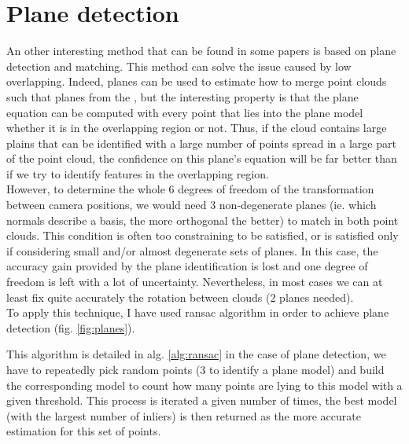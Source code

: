 \section{Plane detection} \label{sec:plane_detection}

An other interesting method that can be found in some papers is based on plane detection and matching. This method can solve the issue caused by low overlapping. Indeed, planes can be used to estimate how to merge point clouds such that planes from the , but the interesting property is that the plane equation can be computed with every point that lies into the plane model whether it is in the overlapping region or not. Thus, if the cloud contains large plains that can be identified with a large number of points spread in a large part of the point cloud, the confidence on this plane's equation will be far better than if we try to identify features in the overlapping region. \\
However, to determine the whole 6 degrees of freedom of the transformation between camera positions, we would need 3 non-degenerate planes (ie. which normals describe a basis, the more orthogonal the better) to match in both point clouds. This condition is often too constraining to be satisfied, or is satisfied only if considering small and/or almost degenerate sets of planes. In this case, the accuracy gain provided by the plane identification is lost and one degree of freedom is left with a lot of uncertainty. Nevertheless, in most cases we can at least fix quite accurately the rotation between clouds (2 planes needed). \\
To apply this technique, I have used \acrshort{ransac} algorithm in order to achieve plane detection (fig. \ref{fig:planes}). 

This algorithm is detailed in alg. \ref{alg:ransac} in the case of plane detection, we have to repeatedly pick random points (3 to identify a plane model) and build the corresponding model to count how many points are lying to this model with a given threshold. This process is iterated a given number of times, the best model (with the largest number of inliers) is then returned as the more accurate estimation for this set of points.

